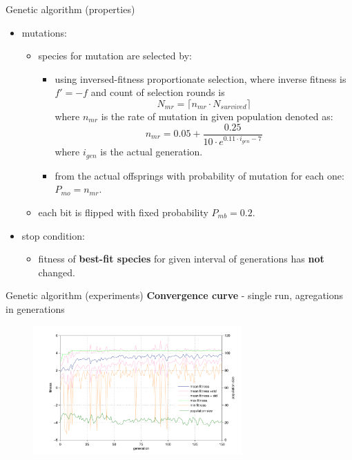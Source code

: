 \documentclass{beamer}
\begin{document}
\begin{frame}{Genetic algorithm (properties)}
\begin{itemize}
	\item mutations:
	\begin{itemize}
		\item species for mutation are selected by:
		\begin{itemize}
			\item using inversed-fitness proportionate
			selection, where inverse fitness is
			$ f'=-f  $
			and count of selection rounds is
			\[ N_{mr} = \lceil n_{mr}\cdot N_{survived} \rceil \]
			where 
			$ n_{mr} $  is the rate of mutation in given population denoted as:			
			\[ n_{mr} = 0.05+\dfrac{0.25}{10\cdot e^{0.11\cdot i_{gen}-7}}\]
			where
			$ i_{gen} $ is the actual generation.\pause
			\item from the actual offsprings with probability of mutation for each one:
			$ P_{mo} = n_{mr} $.
		\end{itemize}\pause
		\item each bit is flipped with fixed probability $ P_{mb} = 0.2 $.\pause
	\end{itemize}
	\item stop condition:\pause
	\begin{itemize}
		\item fitness of \textbf{best-fit species} for given interval of generations has \textbf{not} changed.
	\end{itemize}	
\end{itemize}
\end{frame}

\begin{frame}{Genetic algorithm (experiments)}
	\centering
	\textbf{Convergence curve} - single run, agregations in generations\\
	\begin{figure}[h] %
		\includegraphics[width=80mm]{ga_conv_curve_s}
		\label{ga_conv_curve_r}
	\end{figure}
\end{frame}
\end{document}
